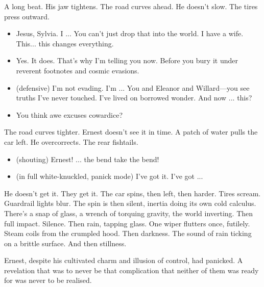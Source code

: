 A long beat. His jaw tightens. The road curves ahead. He doesn’t slow. The tires press outward.

\begin{itemize}[leftmargin=2cm, label={}]


\item[\textbf{Ernest:}]  
Jesus, Sylvia. I ... 
You can’t just drop that into the world. I have a wife. This... this changes everything.


\item[\textbf{Sylvia:}]  
Yes. It does. That’s why I’m telling you now. Before you bury it under reverent footnotes and cosmic evasions.

\item[\textbf{Ernest :}]  (defensive)
I’m not evading. I’m ...  
You and Eleanor and Willard—you see truths I’ve never touched. I’ve lived on borrowed wonder. And now ... this?

\item[\textbf{Sylvia:}]  
You think awe excuses cowardice?
\end{itemize}

The road curves tighter. Ernest doesn’t see it in time. A patch of water pulls the car left. He overcorrects. The rear fishtails.

\begin{itemize}[leftmargin=2cm, label={}]

\item[\textbf{Sylvia :}] (shouting) 
Ernest! ... the bend take the bend!
\end{itemize}

\begin{itemize}[leftmargin=2cm, label={}]

\item[\textbf{Ernest :}] (in full white-knuckled, panick mode) 
I’ve got it. I’ve got ...

\end{itemize}

He doesn’t get it. They get it. The car spins, then left, then harder. Tires scream. Guardrail lights blur. The spin is then silent, inertia doing its own cold calculus. There’s a snap of glass, a wrench of torquing gravity, the world inverting. Then full impact. Silence. Then rain, tapping glass. One wiper flutters once, futilely. Steam coils from the crumpled hood. Then darkness. The sound of rain ticking on a brittle surface. And then stillness.

Ernest, despite his cultivated charm and illusion of control, had panicked. A revelation that was to never be that complication that neither of them was ready for was never to be realised. 

